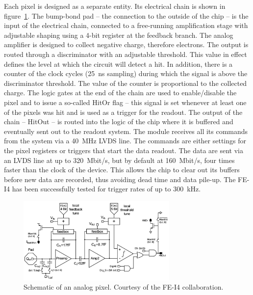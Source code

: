 \documentclass[twoside,12pt]{packages/mytustyle}  %
\begin{document}
Each pixel is designed as a separate entity. Its electrical chain is shown in figure~\ref{fig:anapix}. The bump-bond pad -- the connection to the outside of the chip -- is the input of the electrical chain, connected to a free-running amplification stage with adjustable shaping using a 4-bit register at the feedback branch. The analog amplifier is designed to collect negative charge, therefore electrons. The output is routed through a discriminator with an adjustable threshold. This value in effect defines the level at which the circuit will detect a hit. In addition, there is a counter of the clock cycles (25~ns sampling) during which the signal is above the discriminator threshold. The value of the counter is proportional to the collected charge. The logic gates at the end of the chain are used to enable/disable the pixel and to issue a so-called HitOr flag -- this signal is set whenever at least one of the pixels was hit and is used as a trigger for the readout. The output of the chain -- HitOut -- is routed into the logic of the chip where it is buffered and eventually sent out to the readout system. The module receives all its commands from the system via a 40~MHz LVDS line. The commands are either settings for the pixel registers or triggers that start the data readout. The data are sent via an LVDS line at up to 320~Mbit/s, but by default at 160~Mbit/s, four times faster than the clock of the device. This allows the chip to clear out its buffers before new data are recorded, thus avoiding dead time and data pile-up. The FE-I4 has been successfully tested for trigger rates of up to 300~kHz. 

\begin{figure}[!t]
\centering
\includegraphics[width=0.7\textwidth]{pics/analogPix}
\caption{Schematic of an analog pixel. Courtesy of the FE-I4 collaboration.}
\label{fig:anapix}
\end{figure}
\end{document}
